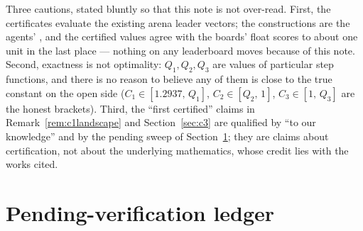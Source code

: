 \documentclass[11pt]{article}
\theoremstyle{remark}
\begin{document}
Three cautions, stated bluntly so that this note is not over-read.
First, the certificates evaluate the existing arena leader vectors; the
constructions are the agents' \cite{Hyra26,Organon26}, and the certified
values agree with the boards' float scores to about one unit in the last
place --- nothing on any leaderboard moves because of this note. Second,
exactness is not optimality: $Q_1, Q_2, Q_3$ are values of particular step
functions, and there is no reason to believe any of them is close to the
true constant on the open side ($C_1 \in [1.2937,\, Q_1]$,
$C_2 \in [Q_2,\, 1]$, $C_3 \in [1,\, Q_3]$ are the honest brackets).
Third, the ``first certified'' claims in Remark~\ref{rem:c1landscape} and
Section~\ref{sec:c3} are qualified by ``to our knowledge'' and by the
pending sweep of Section~\ref{sec:pending}; they are claims about
certification, not about the underlying mathematics, whose credit lies with
the works cited.

\section{Pending-verification ledger}\label{sec:pending}
\end{document}
